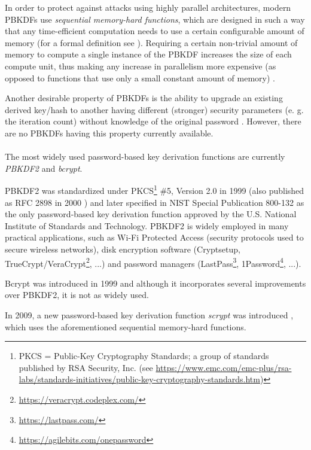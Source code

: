 \documentclass[12pt,oneside]{fithesis2}
\begin{document}
      \label{p:memoryHard}
      In order to protect against attacks using highly parallel architectures, modern PBKDFs use \emph{sequential memory-hard functions}, which are designed in such a way that any time-efficient computation needs to use a certain configurable amount of memory (for a formal definition see \cite[chapter 4]{scrypt}). Requiring a certain non-trivial amount of memory to compute a single instance of the PBKDF increases the size of each compute unit, thus making any increase in parallelism more expensive (as opposed to functions that use only a small constant amount of memory) \cite{scrypt}.
      
      Another desirable property of PBKDFs is the ability to upgrade an existing derived key/hash to another having different (stronger) security parameters (e. g. the iteration count) without knowledge of the original password \cite{openwall:pwHashing}. However, there are no PBKDFs having this property currently available.
      
      \paragraph*{}
      The most widely used password-based key derivation functions are currently \emph{PBKDF2} and \emph{bcrypt}.
      
      PBKDF2 was standardized under PKCS\footnote{PKCS = Public-Key Cryptography Standards; a group of standards published by RSA Security, Inc. (see \url{https://www.emc.com/emc-plus/rsa-labs/standards-initiatives/public-key-cryptography-standards.htm})} \#5, Version 2.0 in 1999 (also published as RFC 2898 in 2000 \cite{rfc2898}) and later specified in NIST Special Publication 800-132 \cite{nist:sp800:132} as the only password-based key derivation function approved by the U.S. National Institute of Standards and Technology. PBKDF2 is widely employed in many practical applications, such as Wi-Fi Protected Access (security protocols used to secure wireless networks), disk encryption software (Cryptsetup, TrueCrypt/VeraCrypt\footnote{\url{https://veracrypt.codeplex.com/}}, ...) and password managers (LastPass\footnote{\url{https://lastpass.com/}}, 1Password\footnote{\url{https://agilebits.com/onepassword}}, ...).
      
      Bcrypt was introduced in 1999 \cite{bcrypt} and although it incorporates several improvements over PBKDF2, it is not as widely used.
      
      In 2009, a new password-based key derivation function \emph{scrypt} was introduced \cite{scrypt}, which uses the aforementioned sequential memory-hard functions.
      
\end{document}
